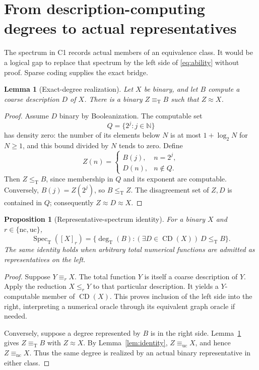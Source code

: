 \documentclass[11pt,a4paper]{article}
\newcommand{\N}{\mathbb N}
\newcommand{\leT}{\leq_{\mathrm T}}
\newcommand{\eqT}{\equiv_{\mathrm T}}
\newcommand{\degT}{\operatorname{deg}_{\mathrm T}}
\newcommand{\Spec}{\operatorname{Spec}_{\mathrm T}}
\newcommand{\CD}{\operatorname{CD}}
\newcommand{\nc}{\mathrm{nc}}
\newcommand{\uc}{\mathrm{uc}}
\newtheorem{lemma}[theorem]{Lemma}
\newtheorem{proposition}[theorem]{Proposition}
\theoremstyle{definition}\newtheorem{definition}[theorem]{Definition}
\theoremstyle{remark}\newtheorem{remark}[theorem]{Remark}
\begin{document}
\section{From description-computing degrees to actual representatives}
\label{sec:spectra}
The spectrum in C1 records actual members of an equivalence class. It would be a logical gap to replace that spectrum by the left side of \eqref{eq:ability} without proof. Sparse coding supplies the exact bridge.

\begin{lemma}[Exact-degree realization]\label{lem:sparse}
Let $X$ be binary, and let $B$ compute a coarse description $D$ of $X$. There is a binary $Z\eqT B$ such that $Z\approx X$.
\end{lemma}
\begin{proof}
Assume $D$ binary by Booleanization. The computable set
\[
 Q=\{2^j:j\in\N\}
\]
has density zero: the number of its elements below $N$ is at most $1+\log_2 N$ for $N\geq1$, and this bound divided by $N$ tends to zero. Define
\begin{equation}\label{eq:sparse}
 Z(n)=\begin{cases}
 B(j),&n=2^j,\\
 D(n),&n\notin Q.
 \end{cases}
\end{equation}
Then $Z\leT B$, since membership in $Q$ and its exponent are computable. Conversely, $B(j)=Z(2^j)$, so $B\leT Z$. The disagreement set of $Z,D$ is contained in $Q$; consequently $Z\approx D\approx X$.
\end{proof}

\begin{proposition}[Representative-spectrum identity]\label{prop:actual}
For a binary $X$ and $r\in\{\nc,\uc\}$,
\begin{equation}\label{eq:actual}
 \Spec([X]_r)
 =\{\degT(B):(\exists D\in\CD(X))\ D\leT B\}.
\end{equation}
The same identity holds when arbitrary total numerical functions are admitted as representatives on the left.
\end{proposition}
\begin{proof}
Suppose $Y\equiv_r X$. The total function $Y$ is itself a coarse description of $Y$. Apply the reduction $X\leq_rY$ to that particular description. It yields a $Y$-computable member of $\CD(X)$. This proves inclusion of the left side into the right, interpreting a numerical oracle through its equivalent graph oracle if needed.

Conversely, suppose a degree represented by $B$ is in the right side. Lemma~\ref{lem:sparse} gives $Z\eqT B$ with $Z\approx X$. By Lemma~\ref{lem:identity}, $Z\equiv_\uc X$, and hence $Z\equiv_\nc X$. Thus the same degree is realized by an actual binary representative in either class.
\end{proof}
\end{document}

